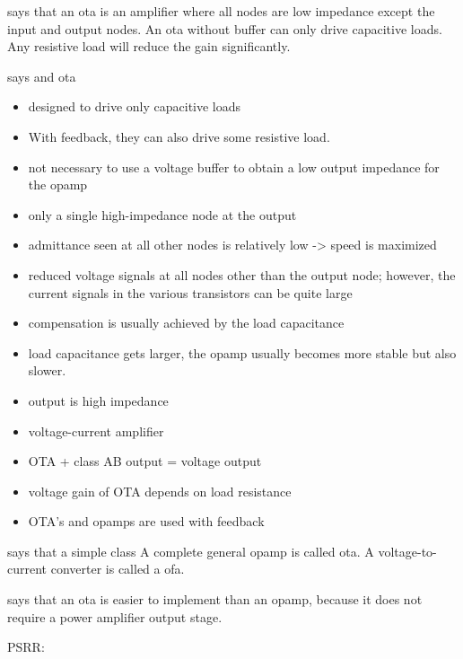 \documentclass{article}[11pt]
\begin{document}
\medskip

\cite[section 24.3]{baker-cmoscircdesnsim-10} says that an \gls{ota} is an amplifier 
where all nodes are low impedance except the input and output nodes.
An \gls{ota} without buffer can only drive capacitive loads.
Any resistive load will reduce the gain significantly.

\medskip

\cite[section 6.4]{johnsmartin-aicd-12} says and \gls{ota}
\begin{itemize}
  \item designed to drive only capacitive loads
  \item With feedback, they can also drive some resistive load.
  \item not necessary to use a voltage buffer to obtain a low output impedance for the opamp
  \item only a single high-impedance node at the output
  \item admittance seen at all other nodes is relatively low -> speed is maximized
  \item reduced voltage signals at all nodes other than the output node; however, the current signals in the various transistors can be quite large
  \item compensation is usually achieved by the load capacitance
  \item load capacitance gets larger, the opamp usually becomes more stable but also slower.
\end{itemize}

\medskip

\cite[055 ff.]{sansen-anadesess-06}
\begin{itemize}
  \item output is high impedance
  \item voltage-current amplifier
  \item OTA + class AB output = voltage output
  \item voltage gain of OTA depends on load resistance
  \item OTA's and opamps are used with feedback
\end{itemize}

\medskip

\cite{huijsing-opamp-17} says that a simple class A complete general opamp
is called \gls{ota}.
A voltage-to-current converter is called a \gls{ofa}.

\medskip

\cite[subsection 10.5.4]{wicht-pmic-24} says that an \gls{ota} is easier to implement 
than an opamp, because it does not require a power amplifier output stage.

\medskip

PSRR: \cite{steyaert-psrrota-90}

\printbibliography
\end{document}

